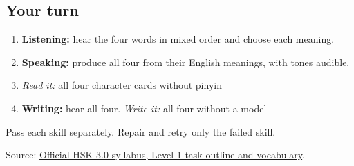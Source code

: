 \subsection*{Your turn}
\begin{enumerate}
\raggedright
  \item \textbf{Listening:} hear the four words in mixed order and choose each meaning.
  \item \textbf{Speaking:} produce all four from their English meanings, with tones audible.
  \item \emph{Read it:} all four character cards without pinyin
  \item \textbf{Writing:} hear all four. \emph{Write it:} all four without a model
\end{enumerate}

Pass each skill separately. Repair and retry only the failed skill.

\begin{tcolorbox}[breakable,colback=teal!4,colframe=teal!35!black,title={Before you move on}]
Source: \href{https://hsk.cn-bj.ufileos.com/3.0/\%E6\%96\%B0\%E7\%89\%88HSK\%E8\%80\%83\%E8\%AF\%95\%E5\%A4\%A7\%E7\%BA\%B21219.pdf}{Official HSK 3.0 syllabus, Level 1 task outline and vocabulary}.
\end{tcolorbox}
